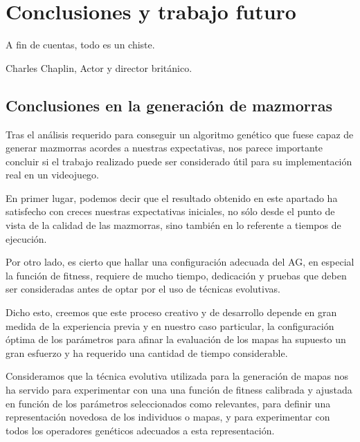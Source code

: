 %
%

\chapter{Conclusiones y trabajo futuro}
\begin{FraseCelebre}
\begin{Frase}
A fin de cuentas, todo es un chiste.
\end{Frase}
\begin{Fuente}
Charles Chaplin, Actor y director brit\'anico.
\end{Fuente}
\end{FraseCelebre}


\section{Conclusiones en la generaci\'on de mazmorras}
Tras el an\'alisis requerido para conseguir un algoritmo gen\'etico que fuese capaz de generar mazmorras acordes a nuestras expectativas, nos parece importante concluir si el trabajo realizado puede ser considerado \'util para su implementaci\'on real en un videojuego.\par
En primer lugar, podemos decir que el resultado obtenido en este apartado ha satisfecho con creces nuestras expectativas iniciales, no s\'olo desde el punto de vista de la calidad de las mazmorras, sino tambi\'en en lo referente a tiempos de ejecuci\'on.\par
Por otro lado, es cierto que hallar una configuraci\'on adecuada del AG, en especial la funci\'on de fitness, requiere de mucho tiempo, dedicaci\'on y pruebas que deben ser consideradas antes de optar por el uso de t\'ecnicas evolutivas.\par
Dicho esto, creemos que este proceso creativo y de desarrollo depende en gran medida de la experiencia previa y en nuestro caso particular, la configuraci\'on \'optima de los par\'ametros para afinar la evaluaci\'on de los mapas ha supuesto un gran esfuerzo y ha requerido una cantidad de tiempo considerable.\par
Consideramos que la t\'ecnica evolutiva utilizada para la generaci\'on de mapas nos ha servido para experimentar con una una funci\'on de fitness calibrada y ajustada en funci\'on de los par\'ametros seleccionados como relevantes, para definir una representaci\'on novedosa de los individuos o mapas, y para experimentar con todos los operadores gen\'eticos adecuados a esta representaci\'on.\par
